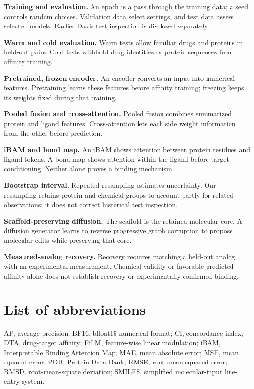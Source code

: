 \documentclass[12pt,a4paper]{article}
\begin{document}
\textbf{Training and evaluation.} An epoch is a pass through the training data; a seed controls random choices. Validation data select settings, and test data assess selected models. Earlier Davis test inspection is disclosed separately.

\textbf{Warm and cold evaluation.} Warm tests allow familiar drugs and proteins in held-out pairs. Cold tests withhold drug identities or protein sequences from affinity training.

\textbf{Pretrained, frozen encoder.} An encoder converts an input into numerical features. Pretraining learns these features before affinity training; freezing keeps its weights fixed during that training.

\textbf{Pooled fusion and cross-attention.} Pooled fusion combines summarized protein and ligand features. Cross-attention lets each side weight information from the other before prediction.

\textbf{iBAM and bond map.} An iBAM shows attention between protein residues and ligand tokens. A bond map shows attention within the ligand before target conditioning. Neither alone proves a binding mechanism.

\textbf{Bootstrap interval.} Repeated resampling estimates uncertainty. Our resampling retains protein and chemical groups to account partly for related observations; it does not correct historical test inspection.

\textbf{Scaffold-preserving diffusion.} The scaffold is the retained molecular core. A diffusion generator learns to reverse progressive graph corruption to propose molecular edits while preserving that core.

\textbf{Measured-analog recovery.} Recovery requires matching a held-out analog with an experimental measurement. Chemical validity or favorable predicted affinity alone does not establish recovery or experimentally confirmed binding.

\section*{List of abbreviations}
AP, average precision; BF16, bfloat16 numerical format; CI, concordance index; DTA, drug-target affinity; FiLM, feature-wise linear modulation; iBAM, Interpretable Binding Attention Map; MAE, mean absolute error; MSE, mean squared error; PDB, Protein Data Bank; RMSE, root mean squared error; RMSD, root-mean-square deviation; SMILES, simplified molecular-input line-entry system.
\end{document}
